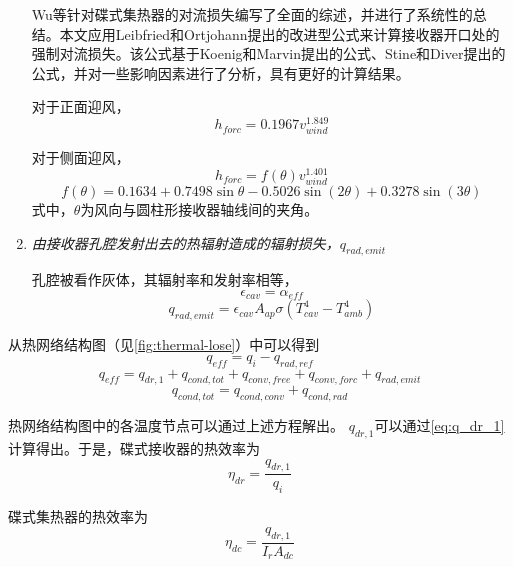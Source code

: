 \begin{enumerate}[label=(\arabic*)]
    Wu等\cite{Wu2010}针对碟式集热器的对流损失编写了全面的综述，并进行了系统性的总结。本文应用Leibfried和Ortjohann\cite{Leibfried1995}提出的改进型公式来计算接收器开口处的强制对流损失。该公式基于Koenig和Marvin\cite{Koenig1981}提出的公式、Stine和Diver\cite{Stine1994}提出的公式，并对一些影响因素进行了分析，具有更好的计算结果。

对于正面迎风，
\begin{equation}
	h_{forc}=0.1967v_{wind}^{1.849}
\end{equation}

对于侧面迎风，
\begin{equation}
	h_{forc}=f(\theta)v_{wind}^{1.401}
\end{equation}
\begin{equation}
	f(\theta)=0.1634 + 0.7498\sin\theta - 0.5026\sin(2\theta) + 0.3278\sin(3\theta)
\end{equation}
式中，$\theta$为风向与圆柱形接收器轴线间的夹角。

  \item \emph{由接收器孔腔发射出去的热辐射造成的辐射损失，$q_{rad,emit}$}
  
  孔腔被看作灰体，其辐射率和发射率相等，
\begin{equation}
    \epsilon_{cav}=\alpha_{eff}
\end{equation}
\begin{equation}
    q_{rad,emit}=\epsilon_{cav}A_{ap}\sigma(T_{cav}^{4}-T_{amb}^{4})
\end{equation}
\end{enumerate}

从热网络结构图（见\autoref{fig:thermal-lose}）中可以得到
\begin{equation}
  q_{eff} = q_i - q_{rad,ref}
\end{equation}
\begin{equation}
  q_{eff} = q_{dr,1} + q_{cond,tot} + q_{conv,free} + q_{conv,forc}+q_{rad,emit}
\end{equation}
\begin{equation}
  q_{cond,tot} = q_{cond,conv}+q_{cond,rad}
\end{equation}

热网络结构图中的各温度节点可以通过上述方程解出。
$q_{dr,1}$可以通过\autoref{eq:q_dr_1}计算得出。于是，碟式接收器的热效率为
\begin{equation}
  \eta_{dr} = \frac{q_{dr,1}}{q_i}
\end{equation}

碟式集热器的热效率为
\begin{equation}
  \eta_{dc} = \frac{q_{dr,1}}{I_rA_{dc}}
\end{equation}

